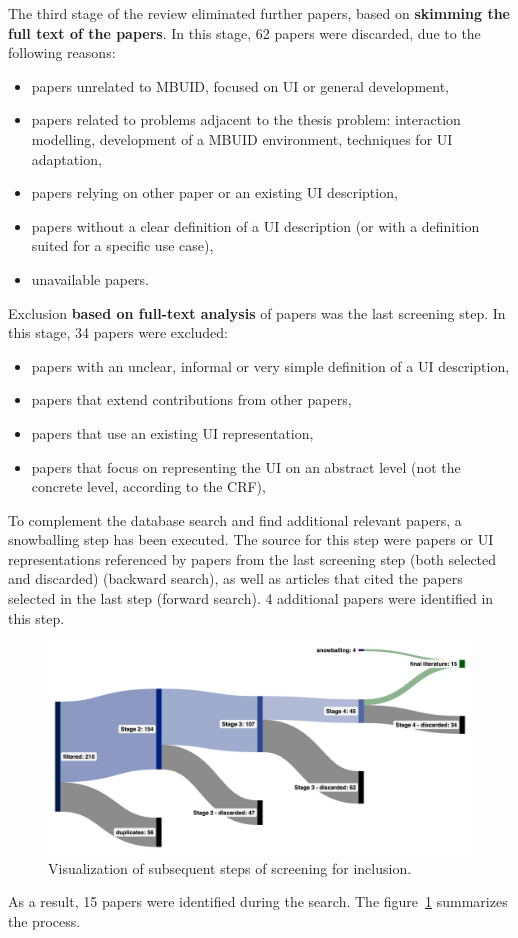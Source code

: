 The third stage of the review eliminated further papers, based on \textbf{skimming the full text of the papers}.
In this stage, 62 papers were discarded, due to the following reasons:
\begin{itemize}
    \item papers unrelated to MBUID, focused on UI or general development,
    \item papers related to problems adjacent to the thesis problem: interaction modelling, development of a MBUID environment, techniques for UI adaptation,
    \item papers relying on other paper or an existing UI description,
    \item papers without a clear definition of a UI description (or with a definition suited for a specific use case),
    \item unavailable papers.
\end{itemize}

Exclusion \textbf{based on full-text analysis} of papers was the last screening step.
In this stage, 34 papers were excluded:
\begin{itemize}
    \item papers with an unclear, informal or very simple definition of a UI description,
    \item papers that extend contributions from other papers,
    \item papers that use an existing UI representation,
    \item papers that focus on representing the UI on an abstract level (not the concrete level, according to the CRF),
\end{itemize}

To complement the database search and find additional relevant papers, a snowballing step has been executed.
The source for this step were papers or UI representations referenced by papers from the last screening step (both selected and discarded) (backward search), as well as articles that cited the papers selected in the last step (forward search).
4 additional papers were identified in this step.

\begin{figure}
    \centering
    \includegraphics[width=\textwidth]{./2-literature-review/search-execution}
    \caption{Visualization of subsequent steps of screening for inclusion.}
    \label{fig:search-execution-vis}
\end{figure}

As a result, 15 papers were identified during the search.
The figure~\ref{fig:search-execution-vis} summarizes the process.

